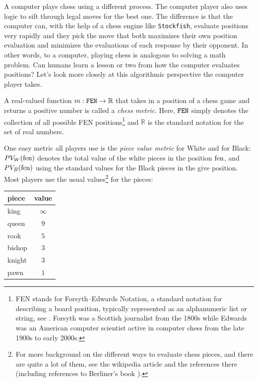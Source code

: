\documentclass[12pt]{book}
\def\FEN{\tt{FEN}}
\def\rrr{\mathbb{R}}
\begin{document}
A computer plays chess using a different process.
The computer player also uses logic to sift through legal moves
for the best one. The difference is that the computer can, with the help of
a chess engine like {\tt Stockfish}, evaluate positions very rapidly
and they pick the move that both maximizes their own position
evaluation and minimizes the evaluations of each response by their opponent.
In other words, to a computer, playing chess is analogous to
solving a math problem. Can humans learn a lesson or two from how
the computer evaluates positions? Let's look more closely at this
algorithmic perspective the computer player takes.

A real-valued function $m:\FEN\to\rrr$
that takes in a position of a chess game and
returns a positive number is called a {\it chess metric}.
Here, $\FEN$ simply denotes the collection of
all possible FEN positions\footnote{FEN stands for
Forsyth–Edwards Notation, a standard notation for describing a
board position, typically represented as an alphanumeric list or string,
see \cite{FEN}. Forsyth was a Scottish journalist from the
1800s while Edwards was an American computer scientist active in
computer chess from the late 1900s to early 2000s.}
and $\rrr$ is the standard notation for the set of real numbers.

One easy metric all players use is the {\it piece value metric}
for White and for Black: $PV_W({\rm fen})$ denotes the total value
of the white pieces in the position ${\rm fen}$,
and $PV_B({\rm fen})$  using the standard values for the Black pieces
in the give position.
Most players use the usual values\footnote{For more background
on the different ways to evaluate chess pieces, and there
are quite a lot of them, see 
the wikipedia article \cite{PV} and the references there
(including references to Berliner's book \cite{Be99}).} for the
pieces:

\begin{center}
\begin{tabular}{lc}
piece & value \\ \hline
king & $\infty$ \\
queen & $9$ \\
rook & $5$ \\
bishop & $3$ \\
knight & $3$ \\
pawn & $1$ \\ \hline
\end{tabular}
\end{center}
\end{document}
